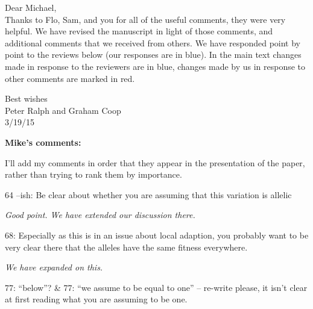 \documentclass[12pt,letterpaper]{article}
\newcommand{\response}[1]{\emph{ \color{blue} #1}}
\begin{document}
Dear Michael,\\
Thanks to Flo, Sam, and you for all of the useful comments, they were very helpful. We have revised the manuscript in light of those comments, and additional comments that we received from others. We have responded point by point to the reviews below (our responses are in blue). In the main text changes made in response to the reviewers are in blue, changes made by us in response to other comments are marked in red.

 
Best wishes\\
Peter Ralph and Graham Coop\\
3/19/15
\newpage 









{\bf Mike's comments:}

I'll add my comments in order that they appear in the presentation of the paper, rather than trying to rank them by importance.

64 --ish: Be clear about whether you are assuming that this variation is allelic

\response{Good point. We have extended our discussion there. }


68: Especially as this is in an issue about local adaption, you probably want to be very clear there that the alleles have the same fitness everywhere.

\response{We have expanded on this.}

77: ``below''? \& 77: ``we assume to be equal to one'' -- re-write please, it isn't clear at first reading what you are assuming to be one.
\end{document}
